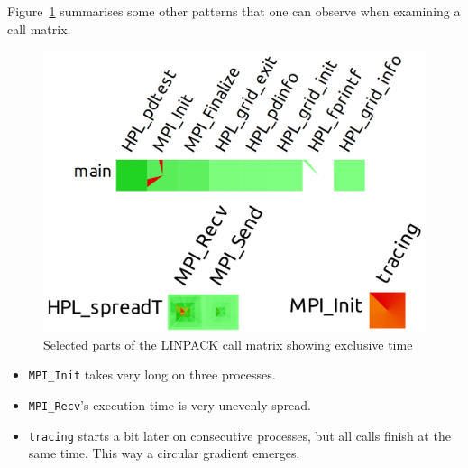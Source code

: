 \documentclass[b5paper, final, hauptseminar]{zih-template}
\begin{document}
Figure~\ref{fig:id-m-lp-3} summarises some other patterns that one can observe when examining a call matrix.
\begin{figure}[htbp]
	\centering
	\includegraphics[width=0.8\linewidth]{id-m-lp-3}
	\caption{Selected parts of the LINPACK call matrix showing exclusive time}
	\label{fig:id-m-lp-3}
\end{figure}
\begin{itemize}
	\item \texttt{MPI\_Init} takes very long on three processes.
	\item \texttt{MPI\_Recv}'s execution time is very unevenly spread.
	\item \texttt{tracing} starts a bit later on consecutive processes, but all calls finish at the same time. This way a circular gradient emerges.
\end{itemize}
\end{document}

